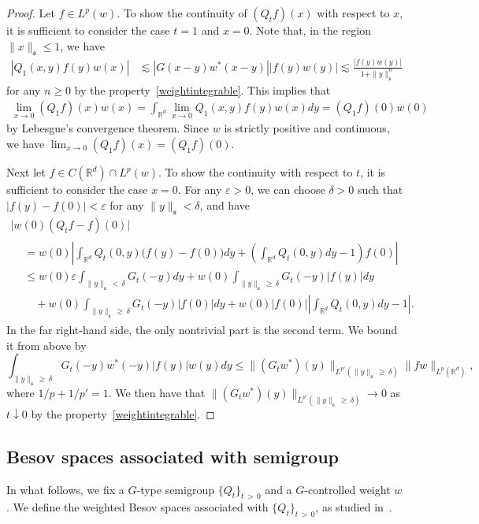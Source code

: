 \documentclass[10pt]{amsart}
\theoremstyle{definition}
\numberwithin{equation}{section}
\newcommand{\bbR}{\mathbb{R}}
\newcommand{\mfs}{\mathfrak{s}}
\newcommand{\wco}{w^*}
\begin{document}
\begin{proof}
Let $f\in L^p(w)$. To show the continuity of $(Q_tf)(x)$ with respect to $x$, it is sufficient to consider the case $t=1$ and $x=0$. Note that, in the region $\|x\|_\mfs\le1$, we have
\begin{align*}
|Q_1(x,y)f(y)w(x)| &\lesssim |G(x-y)\wco(x-y)||f(y)w(y)|\lesssim \frac{|f(y)w(y)|}{1+\|y\|_\mfs^n}
\end{align*}
for any $n\ge0$ by the property~\eqref{weightintegrable}. This implies that
\begin{align*}
\lim_{x\to0}(Q_1f)(x)w(x)=\int_{\bbR^d}\lim_{x\to0}Q_1(x,y)f(y)w(x)dy=(Q_1f)(0)w(0)
\end{align*}
by Lebesgue's convergence theorem. Since $w$ is strictly positive and continuous, we have $\lim_{x\to0}(Q_1f)(x)=(Q_1f)(0)$.

Next let $f\in C(\bbR^d)\cap L^p(w)$. To show the continuity with respect to $t$, it is sufficient to consider the case $x=0$. For any $\varepsilon>0$, we can choose $\delta>0$ such that $|f(y)-f(0)|<\varepsilon$ for any $\|y\|_\mfs<\delta$, and have
\begin{multline*}
\big|w(0)(Q_tf-f)(0)\big|\\
\begin{aligned}
&=w(0)\left|\int_{\bbR^d}Q_t(0,y)\big(f(y)-f(0)\big)dy+\left(\int_{\bbR^d}Q_t(0,y)dy-1\right)f(0)\right|\\
&\le w(0)\varepsilon\int_{\|y\|_\mfs\,<\,\delta}G_t(-y)dy+w(0)\int_{\|y\|_\mfs\,\ge\,\delta}G_t(-y)|f(y)|dy\\
&\quad+w(0)\int_{\|y\|_\mfs\,\ge\,\delta}G_t(-y)|f(0)|dy+w(0)|f(0)|\left|\int_{\bbR^d}Q_t(0,y)dy-1\right|.
\end{aligned}
\end{multline*}
In the far right-hand side, the only nontrivial part is the second term. We bound it from above by
\[
\int_{\|y\|_\mfs\,\ge\,\delta}G_t(-y)\wco(-y)|f(y)|w(y)dy\le\|(G_t\wco)(y)\|_{L^{p'}(\|y\|_\mfs\,\ge\,\delta)}\|fw\|_{L^p\left(\bbR^d\right)},
\]
where $1/p+1/{p'}=1$. We then have that $\|(G_t\wco)(y)\|_{L^{p'}(\|y\|_\mfs\,\ge\,\delta)}\to0$ as $t\downarrow0$ by the property~\eqref{weightintegrable}.
\end{proof}

\subsection{Besov spaces associated with semigroup}

In what follows, we fix a $G$-type semigroup $\{Q_t\}_{t\,>\,0}$ and a $G$-controlled weight $w$. We define the weighted Besov spaces associated with $\{Q_t\}_{t\,>\,0}$, as studied in~\cite{BB16,BDY12, GL15}.
\end{document}
